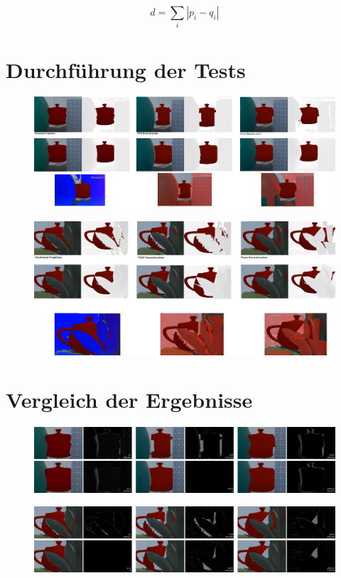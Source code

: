 \begin{equation} \label{eq:diff}
d = \sum_i |p_i-q_i|
\end{equation}

\section{Durchführung der Tests}

\begin{figure}[h]
  \centering
	\includegraphics[width=1.0\textwidth]{content/images/evaluation/static_occlusion.png} 
  \caption{}
  \label{fig:static_occlusion}
\end{figure}

\begin{figure}[h]
  \centering
	\includegraphics[width=1.0\textwidth]{content/images/evaluation/plant_occlusion.png} 
  \caption{}
  \label{fig:plant_occlusion}
\end{figure}

\section{Vergleich der Ergebnisse}

\begin{figure}[h]
  \centering
	\includegraphics[width=1.0\textwidth]{content/images/evaluation/static_occlusion_results.png} 
  \caption{}
  \label{fig:static_occlusion_results}
\end{figure}

\begin{figure}[h]
  \centering
	\includegraphics[width=1.0\textwidth]{content/images/evaluation/plant_occlusion_results.png} 
  \caption{}
  \label{fig:plant_occlusion_results}
\end{figure}